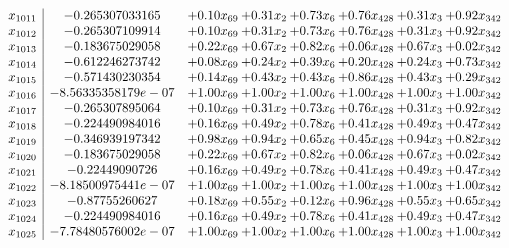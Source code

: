 \documentclass[8pt]{article}
\begin{document}
\[\begin{array}{c| c c@{\hskip 2pt} c@{\hskip 2pt} c@{\hskip 2pt} c@{\hskip 2pt} c@{\hskip 2pt} c@{\hskip 2pt} }
 x_{1011}   &  -0.265307033165 & +  0.10 x_{69} & +  0.31 x_{2} & +  0.73 x_{6} & +  0.76 x_{428} & +  0.31 x_{3} & +  0.92 x_{342}\\
 x_{1012}   &  -0.265307109914 & +  0.10 x_{69} & +  0.31 x_{2} & +  0.73 x_{6} & +  0.76 x_{428} & +  0.31 x_{3} & +  0.92 x_{342}\\
 x_{1013}   &  -0.183675029058 & +  0.22 x_{69} & +  0.67 x_{2} & +  0.82 x_{6} & +  0.06 x_{428} & +  0.67 x_{3} & +  0.02 x_{342}\\
 x_{1014}   &  -0.612246273742 & +  0.08 x_{69} & +  0.24 x_{2} & +  0.39 x_{6} & +  0.20 x_{428} & +  0.24 x_{3} & +  0.73 x_{342}\\
 x_{1015}   &  -0.571430230354 & +  0.14 x_{69} & +  0.43 x_{2} & +  0.43 x_{6} & +  0.86 x_{428} & +  0.43 x_{3} & +  0.29 x_{342}\\
 x_{1016}   &  -8.56335358179e-07 & +  1.00 x_{69} & +  1.00 x_{2} & +  1.00 x_{6} & +  1.00 x_{428} & +  1.00 x_{3} & +  1.00 x_{342}\\
 x_{1017}   &  -0.265307895064 & +  0.10 x_{69} & +  0.31 x_{2} & +  0.73 x_{6} & +  0.76 x_{428} & +  0.31 x_{3} & +  0.92 x_{342}\\
 x_{1018}   &  -0.224490984016 & +  0.16 x_{69} & +  0.49 x_{2} & +  0.78 x_{6} & +  0.41 x_{428} & +  0.49 x_{3} & +  0.47 x_{342}\\
 x_{1019}   &  -0.346939197342 & +  0.98 x_{69} & +  0.94 x_{2} & +  0.65 x_{6} & +  0.45 x_{428} & +  0.94 x_{3} & +  0.82 x_{342}\\
 x_{1020}   &  -0.183675029058 & +  0.22 x_{69} & +  0.67 x_{2} & +  0.82 x_{6} & +  0.06 x_{428} & +  0.67 x_{3} & +  0.02 x_{342}\\
 x_{1021}   &  -0.22449090726 & +  0.16 x_{69} & +  0.49 x_{2} & +  0.78 x_{6} & +  0.41 x_{428} & +  0.49 x_{3} & +  0.47 x_{342}\\
 x_{1022}   &  -8.18500975441e-07 & +  1.00 x_{69} & +  1.00 x_{2} & +  1.00 x_{6} & +  1.00 x_{428} & +  1.00 x_{3} & +  1.00 x_{342}\\
 x_{1023}   &  -0.87755260627 & +  0.18 x_{69} & +  0.55 x_{2} & +  0.12 x_{6} & +  0.96 x_{428} & +  0.55 x_{3} & +  0.65 x_{342}\\
 x_{1024}   &  -0.224490984016 & +  0.16 x_{69} & +  0.49 x_{2} & +  0.78 x_{6} & +  0.41 x_{428} & +  0.49 x_{3} & +  0.47 x_{342}\\
 x_{1025}   &  -7.78480576002e-07 & +  1.00 x_{69} & +  1.00 x_{2} & +  1.00 x_{6} & +  1.00 x_{428} & +  1.00 x_{3} & +  1.00 x_{342}\\

\end{array}\]
\end{document}
